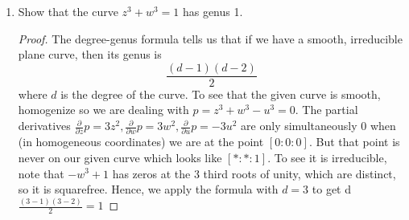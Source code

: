 \documentclass{article}
\begin{document}
\begin{enumerate}
	\item Show that the curve $z^3+w^3=1$ has genus 1.
	
	\begin{proof}
		The degree-genus formula tells us that if we have a smooth, irreducible plane curve, then 
		its genus is 
		\[ \frac{(d-1)(d-2)}{2}\]
		where $d$ is the degree of the curve. To see that the given curve is smooth, homogenize
		so we are dealing with $p = z^3+w^3-u^3 = 0$. The partial derivatives 
		$\frac{\partial}{\partial z} p = 3z^2,
		\frac{\partial}{\partial w} p = 3w^2,
		\frac{\partial}{\partial u} p = -3u^2$
		are only simultaneously $0$ when (in homogeneous coordinates) we are at the point 
		$[0:0:0]$. But that point is never on our given curve which looks like
		$[* : * : 1]$. To see it is irreducible, note that $-w^3+1$ has zeros at the 3 third roots of unity,
		which are distinct, so it is squarefree. Hence, we apply the formula with $d=3$ to get 
		d$\frac{(3-1)(3-2)}{2} = 1$
		\end{proof}
		
\end{enumerate}
\end{document}
